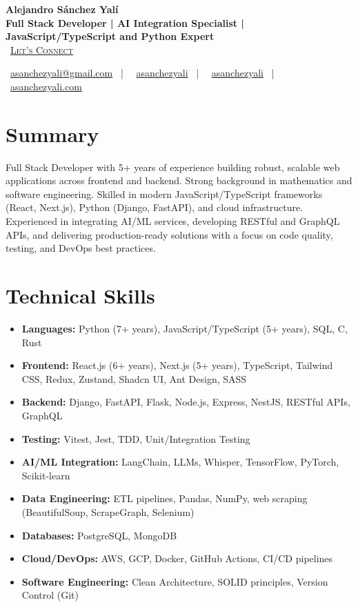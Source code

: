 \documentclass[letterpaper,11pt]{article}
\newcommand{\normalfaCalendar}{{\mdseries\faCalendar}}
\newcommand{\normalfaEnvelope}{{\mdseries\faEnvelope}}
\newcommand{\normalfaLinkedin}{{\mdseries\faLinkedin}}
\newcommand{\normalfaGithub}{{\mdseries\faGithub}}
\newcommand{\normalfaGlobe}{{\mdseries\faGlobe}}
\begin{document}
\begin{center}
\textbf{\Huge Alejandro Sánchez Yalí}\\[0.2em]
\textbf{\Large Full Stack Developer | AI Integration Specialist | JavaScript/TypeScript and Python Expert}\\[0.4em]
\small
\normalfaCalendar\ \href{https://cal.com/asanchezyali/full-time-opportunities}{\textsc{Let's Connect}}

\vspace{0.8em}
\normalfaEnvelope\ \href{mailto:asanchezyali@gmail.com}{asanchezyali@gmail.com}  ~|~
\normalfaLinkedin\ \href{https://www.linkedin.com/in/asanchezyali}{asanchezyali} ~|~
\normalfaGithub\ \href{https://github.com/asanchezyali}{asanchezyali}  ~|~
\normalfaGlobe\ \href{https://asanchezyali.com}{asanchezyali.com}
\end{center}

\section{Summary}
Full Stack Developer with 5+ years of experience building robust, scalable web applications across frontend and backend. Strong background in mathematics and software engineering. Skilled in modern JavaScript/TypeScript frameworks (React, Next.js), Python (Django, FastAPI), and cloud infrastructure. Experienced in integrating AI/ML services, developing RESTful and GraphQL APIs, and delivering production-ready solutions with a focus on code quality, testing, and DevOps best practices.

\section{Technical Skills}
\begin{itemize}[leftmargin=*, itemsep=0pt]
  \item \textbf{Languages:} Python (7+ years), JavaScript/TypeScript (5+ years), SQL, C, Rust
  \item \textbf{Frontend:} React.js (6+ years), Next.js (5+ years), TypeScript, Tailwind CSS, Redux, Zustand, Shadcn UI, Ant Design, SASS
  \item \textbf{Backend:} Django, FastAPI, Flask, Node.js, Express, NestJS, RESTful APIs, GraphQL
  \item \textbf{Testing:} Vitest, Jest, TDD, Unit/Integration Testing
  \item \textbf{AI/ML Integration:} LangChain, LLMs, Whisper, TensorFlow, PyTorch, Scikit-learn
  \item \textbf{Data Engineering:} ETL pipelines, Pandas, NumPy, web scraping (BeautifulSoup, ScrapeGraph, Selenium)
  \item \textbf{Databases:} PostgreSQL, MongoDB
  \item \textbf{Cloud/DevOps:} AWS, GCP, Docker, GitHub Actions, CI/CD pipelines
  \item \textbf{Software Engineering:} Clean Architecture, SOLID principles, Version Control (Git)
\end{itemize}
\end{document}
